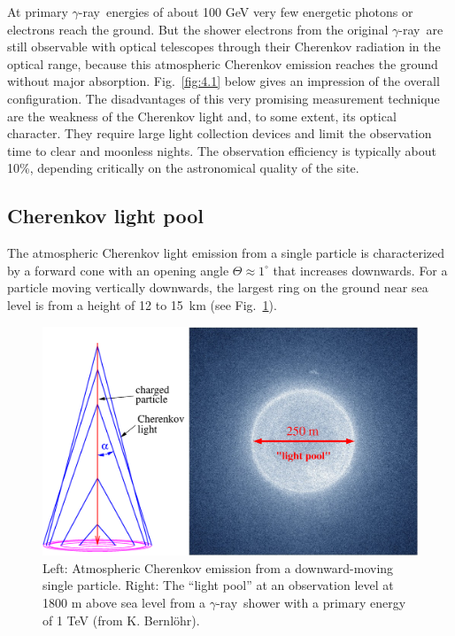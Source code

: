 \documentclass{svjour3x}                     %
\newcommand{\gr}{$\gamma$-ray}
\newcommand{\byKB}{ (from K. Bernl\"ohr)}
\begin{document}
At primary \gr\ energies of about 100 GeV very few energetic photons or
electrons reach the ground. But the shower electrons from the original \gr\ are
still observable with optical telescopes through their Cherenkov radiation in
the optical range, because this atmospheric Cherenkov emission reaches the
ground without major absorption. Fig.~\ref{fig:4.1} below gives an impression
of the overall configuration. The disadvantages of this very promising
measurement technique are the weakness of the Cherenkov light and, to some
extent, its optical character. They require large light collection devices and
limit the observation time to clear and moonless nights. The observation
efficiency is typically about 10\%, depending critically on the astronomical
quality of the site.

\subsection{Cherenkov light pool}
\label{sec:2.1}

The atmospheric Cherenkov light emission from a single particle is
characterized by a forward cone with an opening angle $\Theta\approx 1^{\circ}$
that increases downwards. For a particle moving vertically downwards, the
largest ring on the ground near sea level is from a height of 12 to 15~km (see
Fig.~\ref{fig:3}).

\begin{figure}
  \includegraphics[width=\textwidth]{Cherenkov_lightpool.eps}
  \caption[The ``light pool'']{Left: Atmospheric Cherenkov emission from a downward-moving single
    particle. Right: The ``light pool'' at an observation level at 1800 m
    above sea level from a \gr\ shower with a primary energy of 1 TeV\byKB.}
\label{fig:3}       %
\end{figure}
%
\end{document}
